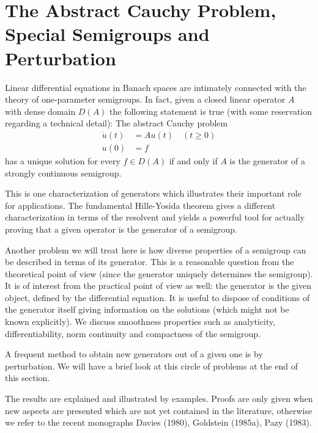 
\section{The Abstract Cauchy Problem, Special Semigroups and Perturbation}

Linear differential equations in Banach spaces are intimately connected with the theory of one-parameter semigroups.
In fact, given a closed linear operator $A$ with dense domain $D(A)$ the following statement is true (with some reservation regarding a technical detail): The abstract Cauchy problem
\[
\begin{aligned}
\dot{u}(t) &= Au(t) \quad (t \geq 0) \\
u(0) &= f
\end{aligned}
\]
has a unique solution for every $f \in D(A)$ if and only if $A$ is the generator of a strongly continuous semigroup.

This is one characterization of generators which illustrates their important role for applications.
The fundamental Hille-Yosida theorem gives a different characterization in terms of the resolvent and yields a powerful tool for actually proving that a given operator is the generator of a semigroup.

Another problem we will treat here is how diverse properties of a semigroup can be described in terms of its generator.
This is a reasonable question from the theoretical point of view (since the generator uniquely determines the semigroup).
It is of interest from the practical point of view as well: the generator is the given object, defined by the differential equation.
It is useful to dispose of conditions of the generator itself giving information on the solutions (which might not be known explicitly).
We discuss smoothness properties such as analyticity, differentiability, norm continuity and compactness of the semigroup.

A frequent method to obtain new generators out of a given one is by perturbation.
We will have a brief look at this circle of problems at the end of this section.

The results are explained and illustrated by examples.
Proofs are only given when new aspects are presented which are not yet contained in the literature, otherwise we refer to the recent monographs Davies (1980), Goldstein (1985a), Pazy (1983).